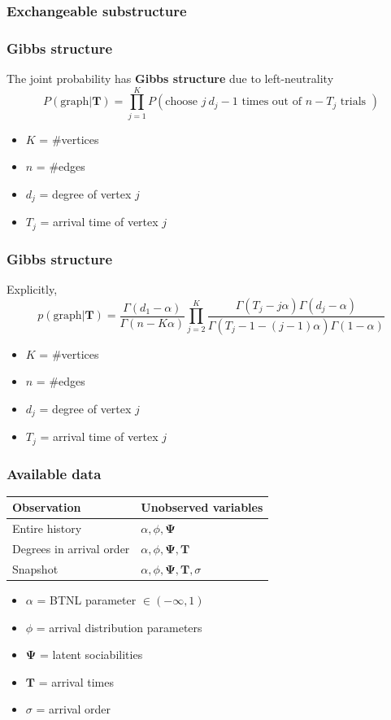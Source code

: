 \documentclass[final,hyperref={pdfpagelabels=false},noamsthm]{beamer}
\newcommand{\bfT}{\mathbf{T}}
\newcommand{\bfPsi}{\boldsymbol{\Psi}}
\begin{document}
\begin{frame}
	\frametitle{Exchangeable substructure}
	\begin{center}
		\resizebox{\textwidth}{!}{}
	\end{center}
\end{frame}

\begin{frame}
	\frametitle{Gibbs structure}
	The joint probability has \textbf{Gibbs structure} due to left-neutrality
	\begin{equation*}
	P(\text{graph}|\bfT) = \prod_{j=1}^K P(\text{choose }j\ d_j-1\text{ times out of } n - T_j \text{ trials })
	\end{equation*}
	\begin{itemize}
		\item $K$ = \#vertices
		\item $n$ = \#edges
		\item $d_j$ = degree of vertex $j$
		\item $T_j$ = arrival time of vertex $j$
	\end{itemize}
\end{frame}

\begin{frame}
	\frametitle{Gibbs structure}
	Explicitly,
	\begin{equation*}
	p(\text{graph}|\bfT) = \frac{\Gamma(d_1 - \alpha)}{\Gamma(n - K\alpha)}\prod_{j=2}^K \frac{\Gamma(T_j - j\alpha)\Gamma(d_j - \alpha)}{\Gamma(T_j - 1 - (j-1)\alpha)\Gamma(1-\alpha)}
	\end{equation*}
	\begin{itemize}
		\item $K$ = \#vertices
		\item $n$ = \#edges
		\item $d_j$ = degree of vertex $j$
		\item $T_j$ = arrival time of vertex $j$
	\end{itemize}
\end{frame}

\begin{frame}
	\frametitle{Available data}
	\begin{center}
		\begin{tabular}{ll}
			\textbf{Observation} & \textbf{Unobserved variables} \\
			\hline
			Entire history & $\alpha,\phi,\bfPsi$ \\
			Degrees in arrival order & $\alpha,\phi,\bfPsi, \bfT$ \\
			Snapshot & $\alpha,\phi,\bfPsi,\bfT,\sigma$
		\end{tabular}
	\end{center}
	\begin{itemize}
		\item $\alpha$ = BTNL parameter $\in (-\infty, 1)$
		\item $\phi$ = arrival distribution parameters
		\item $\bfPsi$ = latent sociabilities
		\item $\bfT$ = arrival times
		\item $\sigma$ = arrival order
	\end{itemize}
\end{frame}
\end{document}
